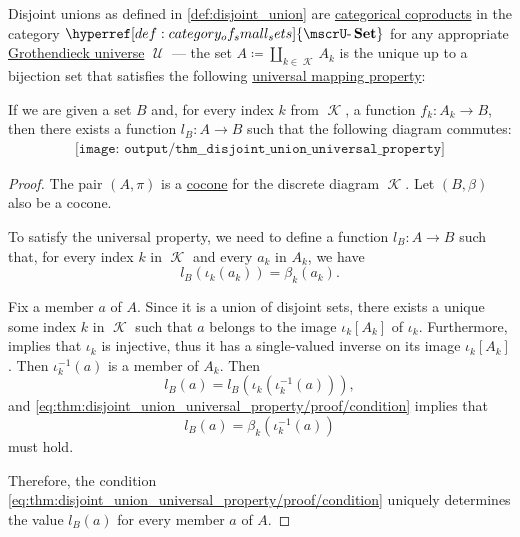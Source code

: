 \begin{theorem}\label{thm:disjoint_union_universal_property}
  Disjoint unions as defined in \cref{def:disjoint_union} are \hyperref[def:discrete_category_limits]{categorical coproducts} in the category \( \hyperref[def:category_of_small_sets]{\ucat{Set}} \) for any appropriate \hyperref[def:grothendieck_universe]{Grothendieck universe} \( \mscrU \) --- the set \( A \coloneqq \coprod_{k \in \mscrK} A_k \) is the unique up to a bijection set that satisfies the following \hyperref[rem:universal_mapping_property]{universal mapping property}:
  \begin{displayquote}
    If we are given a set \( B \) and, for every index \( k \) from \( \mscrK \), a function \( f_k: A_k \to B \), then there exists a function \( l_B: A \to B \) such that the following diagram commutes:
    \begin{equation}\label{eq:thm:disjoint_union_universal_property/diagram}
      \begin{aligned}
        \texttt{[image: output/thm\_\_disjoint\_union\_universal\_property]}
      \end{aligned}
    \end{equation}
  \end{displayquote}
\end{theorem}
\begin{proof}
  The pair \( (A, \pi) \) is a \hyperref[def:category_of_cones/cocone]{cocone} for the discrete diagram \( \mscrK \). Let \( (B, \beta) \) also be a cocone.

  To satisfy the universal property, we need to define a function \( l_B: A \to B \) such that, for every index \( k \) in \( \mscrK \) and every \( a_k \) in \( A_k \), we have
  \begin{equation}\label{eq:thm:disjoint_union_universal_property/proof/condition}
    l_B(\iota_k(a_k)) = \beta_k(a_k).
  \end{equation}

  Fix a member \( a \) of \( A \). Since it is a union of disjoint sets, there exists a unique some index \( k \) in \( \mscrK \) such that \( a \) belongs to the image \( \iota_k[A_k] \) of \( \iota_k \). Furthermore,  implies that \( \iota_k \) is injective, thus it has a single-valued inverse on its image \( \iota_k[A_k] \). Then \( \iota_k^{-1}(a) \) is a member of \( A_k \). Then
  \begin{equation*}
    l_B(a) = l_B(\iota_k(\iota_k^{-1}(a))),
  \end{equation*}
  and \eqref{eq:thm:disjoint_union_universal_property/proof/condition} implies that
  \begin{equation*}
    l_B(a) = \beta_k(\iota_k^{-1}(a))
  \end{equation*}
  must hold.

  Therefore, the condition \eqref{eq:thm:disjoint_union_universal_property/proof/condition} uniquely determines the value \( l_B(a) \) for every member \( a \) of \( A \).
\end{proof}

